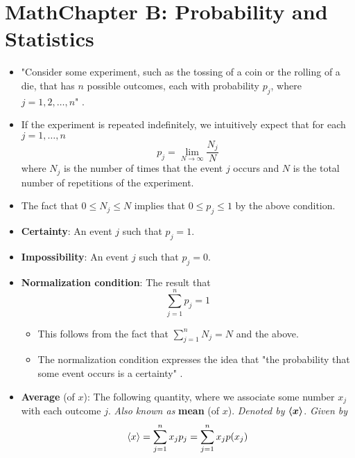 \documentclass[../notes.tex]{subfiles}
\begin{document}
\section{MathChapter B: Probability and Statistics}
\begin{itemize}
    \item {}"Consider some experiment, such as the tossing of a coin or the rolling of a die, that has $n$ possible outcomes, each with probability $p_j$, where $j=1,2,\dots,n$" \parencite[63]{bib:McQuarrieSimon}.
    \item If the experiment is repeated indefinitely, we intuitively expect that for each $j=1,\dots,n$
    \begin{equation*}
        p_j = \lim_{N\to\infty}\frac{N_j}{N}
    \end{equation*}
    where $N_j$ is the number of times that the event $j$ occurs and $N$ is the total number of repetitions of the experiment.
    \item The fact that $0\leq N_j\leq N$ implies that $0\leq p_j\leq 1$ by the above condition.
    \item \textbf{Certainty}: An event $j$ such that $p_j=1$.
    \item \textbf{Impossibility}: An event $j$ such that $p_j=0$.
    \item \textbf{Normalization condition}: The result that
    \begin{equation*}
        \sum_{j=1}^np_j = 1
    \end{equation*}
    \begin{itemize}
        \item This follows from the fact that $\sum_{j=1}^nN_j=N$ and the above.
        \item The normalization condition expresses the idea that "the probability that some event occurs is a certainty" \parencite[64]{bib:McQuarrieSimon}.
    \end{itemize}
    \item \textbf{Average} (of $x$): The following quantity, where we associate some number $x_j$ with each outcome $j$. \emph{Also known as} \textbf{mean} (of $x$). \emph{Denoted by} $\bm{\langle{x}\rangle}$. \emph{Given by}
    \begin{equation*}
        \langle{x}\rangle = \sum_{j=1}^nx_jp_j = \sum_{j=1}^nx_jp(x_j)
    \end{equation*}
    \begin{figure}[h!]
        \centering
\end{figure}
\end{itemize}
\end{document}
